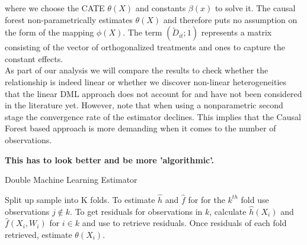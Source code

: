 where we choose the CATE $\theta(X)$ and constants $\beta(x)$ to solve it. The causal forest non-parametrically estimates $\theta(X)$ and therefore puts no assumption on the form of the mapping $\phi(X)$. The term $(\tilde{D}_{it}; 1)$ represents a matrix consisting of the vector of orthogonalized treatments and ones to capture the constant effects. \\
As part of our analysis we will compare the results to check whether the relationship is indeed linear or whether we discover non-linear heterogeneities that the linear DML approach does not account for and have not been considered in the literature yet. However, note that when using a nonparametric second stage the convergence rate of the estimator declines. This implies that the Causal Forest based approach is more demanding when it comes to the number of observations. 

\textbf{This has to look better and be more 'algorithmic'.}
\begin{algorithm}
    \caption{Double Machine Learning Estimator}
    \begin{algorithmic}[1]
        \State Split up sample into K folds. 
        \State To estimate $\widehat{h}$ and $\widehat{f}$ for for the $k^{th}$ fold use observations $j \notin k$. 
        \State To get residuals for observations in $k$, calculate $\widehat{h}(X_i)$ and $\widehat{f}(X_i, W_i)$ for $i \in k$ and use to retrieve residuals.
        \State Once residuals of each fold retrieved, estimate $\theta(X_i)$.
    \end{algorithmic}
\end{algorithm}